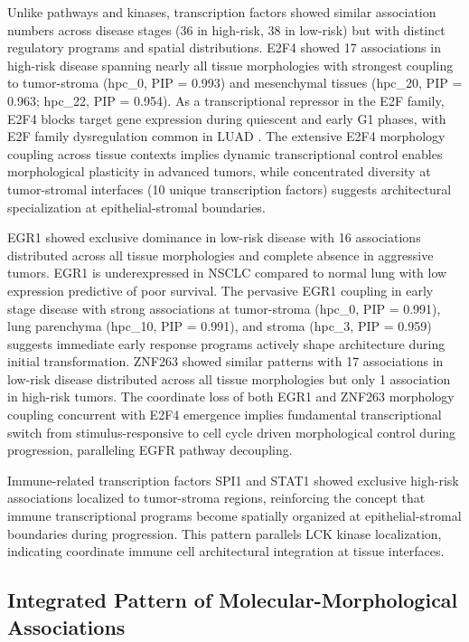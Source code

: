\documentclass[pdflatex,article,12pt]{article}
\begin{document}
Unlike pathways and kinases, transcription factors showed similar association numbers across disease stages (36 in high-risk, 38 in low-risk) but with distinct regulatory programs and spatial distributions. E2F4 showed 17 associations in high-risk disease spanning nearly all tissue morphologies with strongest coupling to tumor-stroma (hpc\_0, PIP = 0.993) and mesenchymal tissues (hpc\_20, PIP = 0.963; hpc\_22, PIP = 0.954). As a transcriptional repressor in the E2F family, E2F4 blocks target gene expression during quiescent and early G1 phases, with E2F family dysregulation common in LUAD \cite{liu2022e2f,zhang2020e2f,zeng2022e2f2}. The extensive E2F4 morphology coupling across tissue contexts implies dynamic transcriptional control enables morphological plasticity in advanced tumors, while concentrated diversity at tumor-stromal interfaces (10 unique transcription factors) suggests architectural specialization at epithelial-stromal boundaries.

EGR1 showed exclusive dominance in low-risk disease with 16 associations distributed across all tissue morphologies and complete absence in aggressive tumors. EGR1 is underexpressed in NSCLC compared to normal lung with low expression predictive of poor survival. The pervasive EGR1 coupling in early stage disease with strong associations at tumor-stroma (hpc\_0, PIP = 0.991), lung parenchyma (hpc\_10, PIP = 0.991), and stroma (hpc\_3, PIP = 0.959) suggests immediate early response programs actively shape architecture during initial transformation. ZNF263 showed similar patterns with 17 associations in low-risk disease distributed across all tissue morphologies but only 1 association in high-risk tumors. The coordinate loss of both EGR1 and ZNF263 morphology coupling concurrent with E2F4 emergence implies fundamental transcriptional switch from stimulus-responsive to cell cycle driven morphological control during progression, paralleling EGFR pathway decoupling.

Immune-related transcription factors SPI1 and STAT1 showed exclusive high-risk associations localized to tumor-stroma regions, reinforcing the concept that immune transcriptional programs become spatially organized at epithelial-stromal boundaries during progression. This pattern parallels LCK kinase localization, indicating coordinate immune cell architectural integration at tissue interfaces.

\subsection{Integrated Pattern of Molecular-Morphological Associations}
\end{document}
